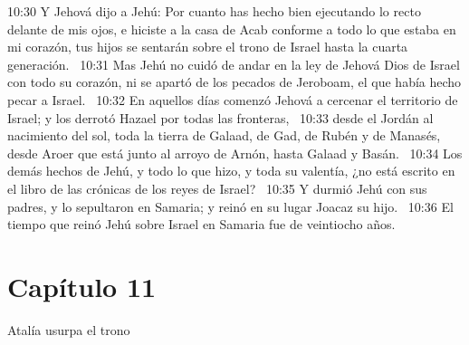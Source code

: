 10:30 Y Jehová dijo a Jehú: Por cuanto has hecho bien ejecutando lo recto delante de mis ojos, e hiciste a la casa de Acab conforme a todo lo que estaba en mi corazón, tus hijos se sentarán sobre el trono de Israel hasta la cuarta generación.  
10:31 Mas Jehú no cuidó de andar en la ley de Jehová Dios de Israel con todo su corazón, ni se apartó de los pecados de Jeroboam, el que había hecho pecar a Israel.  
10:32 En aquellos días comenzó Jehová a cercenar el territorio de Israel; y los derrotó Hazael por todas las fronteras,  
10:33 desde el Jordán al nacimiento del sol, toda la tierra de Galaad, de Gad, de Rubén y de Manasés, desde Aroer que está junto al arroyo de Arnón, hasta Galaad y Basán.  
10:34 Los demás hechos de Jehú, y todo lo que hizo, y toda su valentía, ¿no está escrito en el libro de las crónicas de los reyes de Israel?  
10:35 Y durmió Jehú con sus padres, y lo sepultaron en Samaria; y reinó en su lugar Joacaz su hijo.  
10:36 El tiempo que reinó Jehú sobre Israel en Samaria fue de veintiocho años.  
\section*{Capítulo 11}
Atalía usurpa el trono  


